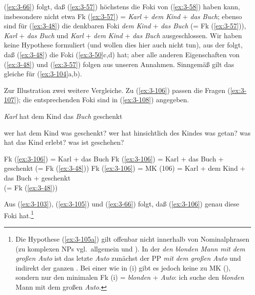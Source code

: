 \documentclass[output=paper]{langsci/langscibook}
\begin{document}
(\ref{ex:3-66}) folgt, daß (\ref{ex:3-57}) höchstens die Foki von (\ref{ex:3-58}) haben kann,
insbesondere nicht etwa Fk (\ref{ex:3-57}) = \textit{Karl} + \textit{dem
  Kind} + \textit{das Buch}; ebenso sind für (\ref{ex:3-48}) die denkbaren Foki \textit{dem Kind} + \textit{das Buch} (= Fk (\ref{ex:3-57})), \textit{Karl} +
\textit{das Buch} und \textit{Karl} + \textit{dem Kind} + \textit{das
  Buch} ausgeschlossen. Wir haben keine Hypothese formuliert (und
wollen dies hier auch nicht tun), aus der folgt, daß (\ref{ex:3-48}) die Foki
(\ref{ex:3-50}c,d) hat; aber alle anderen Eigenschaften von (\ref{ex:3-48}) und (\ref{ex:3-57})
folgen aus unseren Annahmen. Sinngemäß gilt das gleiche für (\ref{ex:3-104}a,b).

Zur Illustration zwei weitere Vergleiche. Zu (\ref{ex:3-106}) passen die Fragen
(\ref{ex:3-107}); die entsprechenden Foki sind in (\ref{ex:3-108}) angegeben.
\begin{exe}
\ex
\label{ex:3-106}
\textit{Karl} hat dem Kind das \textit{Buch} geschenkt
\ex
\label{ex:3-107}
\begin{xlist}
\ex
\label{ex:3-107a}
wer hat dem Kind was geschenkt?
\ex
\label{ex:3-107b}
wer hat hinsichtlich des Kindes was getan? was hat das Kind erlebt?
\ex
\label{ex:3-107c}
was ist geschehen?
\end{xlist}
\ex
\label{ex:3-108}
\begin{xlist}
\ex
\label{ex:3-108a}
Fk (\ref{ex:3-106}) = Karl + das Buch
\ex
\label{ex:3-108b}
Fk (\ref{ex:3-106}) = Karl + das Buch + geschenkt (= Fk (\ref{ex:3-48}))
\ex
\label{ex:3-108c}
Fk (\ref{ex:3-106}) = MK (106) = Karl + dem Kind + das Buch + geschenkt \\
 (= Fk (\ref{ex:3-48}))
\end{xlist}
\end{exe}
Aus (\ref{ex:3-103}), (\ref{ex:3-105}) und (\ref{ex:3-66}) folgt, daß (\ref{ex:3-106}) genau diese
Foki hat.\footnote{\label{fn:3-22}%
  Die Hypothese (\ref{ex:3-105a}) gilt offenbar nicht innerhalb von Nominalphrasen (zu komplexen NPs
  vgl.\ allgemein \citet{Abraham77} und \citet{Fuchs76}). In der  \textit{den blonden Mann mit dem
    großen Auto} ist das letzte  \textit{Auto} zunächst  der PP \textit{mit
    dem großen Auto} und indirekt der ganzen . Bei einer  wie in (i) gibt es jedoch keine
   zu MK (), sondern nur den minimalen  Fk (i) = \textit{blonden} +
  \textit{Auto}: 
  \ea
  \label{ex:3-fn21i}
  ich suche den \textit{blonden} Mann mit dem großen \textit{Auto}.
  \zlast%
}
\end{document}
